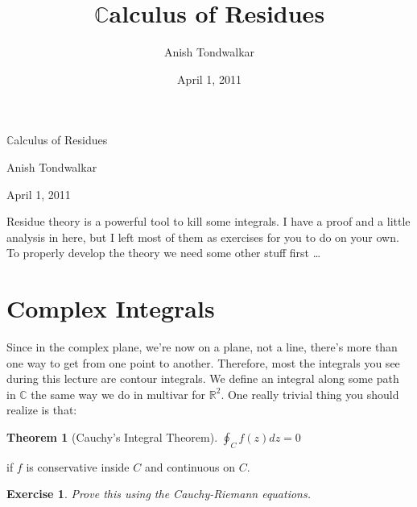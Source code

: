 \documentclass[11pt,notitlepage]{article}
\title{$\mathbb{C}$alculus of Residues}
\author{Anish Tondwalkar}
\date{April 1, 2011}
\newtheorem{thm}{Theorem}[section]
\newtheorem{exc}{Exercise}[section]
\begin{document}
\begin{center}
\Large{$\mathbb{C}$alculus of Residues}
\par
\large{Anish Tondwalkar}
\par
\small{April 1, 2011}
\end{center}
Residue theory is a powerful tool to kill some integrals.  I have a proof and a little analysis in here, but I left most of them as exercises for you to do on your own.  To properly develop the theory we need some other stuff first \ldots
\section{Complex Integrals}
Since in the complex plane, we're now on a plane, not a line, there's more than one way to get from one point to another. Therefore, most the integrals you see during this lecture are contour integrals. We define an integral along some path in $\mathbb{C}$ the same way we do in multivar for $\mathbb{R}^2$. One really trivial thing you should realize is that:
\begin{thm}[Cauchy's Integral Theorem]
$\oint_C f(z) dz = 0$ 
\end{thm}
\begin{flushright}
if $f$ is conservative inside $C$ and continuous on $C$.
\end{flushright}
\begin{exc}
Prove this using the Cauchy-Riemann equations.
\end{exc}
\end{document}
